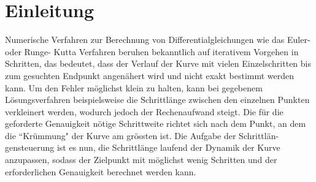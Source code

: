 %
%
%
\section{Einleitung\label{steps:section:einleitung}}

Numerische Verfahren zur Berechnung von Differentialgleichungen wie das Euler- oder Runge-
Kutta Verfahren beruhen bekanntlich auf iterativem Vorgehen in Schritten, das bedeutet, dass der Verlauf
der Kurve mit vielen Einzelschritten bis zum gesuchten Endpunkt angenähert wird und nicht exakt
bestimmt werden kann. Um den Fehler möglichst klein zu halten,
kann bei gegebenem Lösungsverfahren beispielsweise die Schrittlänge zwischen den einzelnen Punkten verkleinert werden, wodurch
jedoch der Rechenaufwand steigt. Die für die geforderte Genauigkeit nötige Schrittweite richtet sich
nach dem Punkt, an dem die ``Krümmung" der Kurve am grössten ist. Die Aufgabe der Schrittlän-
gensteuerung ist es nun, die Schrittlänge laufend der Dynamik der Kurve anzupassen, sodass der
Zielpunkt mit möglichst wenig Schritten und der erforderlichen Genauigkeit berechnet werden
kann.

